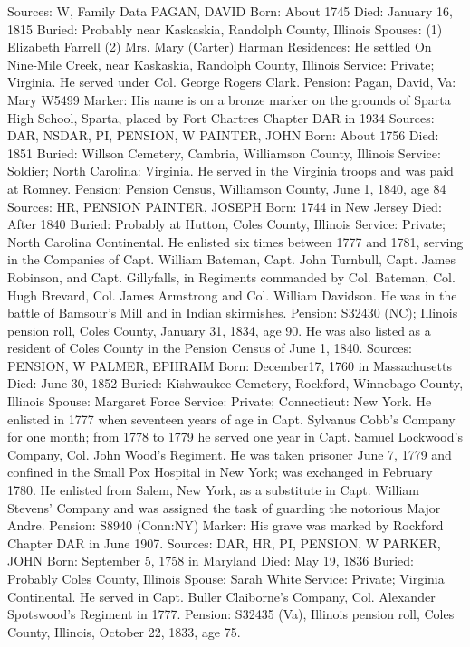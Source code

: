 Sources: W, Family Data 
PAGAN, DAVID 
Born: About 1745 
Died: January 16, 1815
Buried: Probably near Kaskaskia, Randolph County, Illinois 
Spouses: (1) Elizabeth Farrell
	 (2) Mrs. Mary (Carter) Harman
Residences: He settled On Nine-Mile Creek, near Kaskaskia, Randolph County, Illinois
Service: Private; Virginia. He served under Col. George Rogers Clark. Pension: Pagan, David, Va: Mary W5499
Marker: His name is on a bronze marker on the grounds of Sparta High School, Sparta, placed by Fort Chartres Chapter DAR in 1934
Sources: DAR, NSDAR, PI, PENSION, W 
PAINTER, JOHN 
Born: About 1756
Died: 1851
Buried: Willson Cemetery, Cambria, Williamson County, Illinois
Service: Soldier; North Carolina: Virginia. He served in the Virginia troops and was paid at Romney. 
Pension: Pension Census, Williamson County, June 1, 1840, age 84
Sources: HR, PENSION 
PAINTER, JOSEPH 
Born: 1744 in New Jersey
Died: After 1840
Buried: Probably at Hutton, Coles County, Illinois
Service: Private; North Carolina Continental. He enlisted six times between 1777 and 1781, serving in the Companies of Capt. William Bateman, Capt. John Turnbull, Capt. James Robinson, and Capt. Gillyfalls, in Regiments com­manded by Col. Bateman, Col. Hugh Brevard, Col. James Armstrong and Col. William Davidson. He was in the battle of Bamsour's Mill and in Indian skirmishes. 
Pension: S32430 (NC); Illinois pension roll, Coles County, January 31, 1834, age 90. He was also listed as a resident of Coles County in the Pension Census of June 1, 1840. 
Sources: PENSION, W 
PALMER, EPHRAIM 
Born: December17, 1760 in Massachusetts
Died: June 30, 1852
Buried: Kishwaukee Cemetery, Rockford, Winnebago County, Illinois 
Spouse: Margaret Force
Service: Private; Connecticut: New York. He enlisted in 1777 when seventeen years of age in Capt. Sylvanus Cobb's Company for one month; from 1778 to 1779 he served one year in Capt. Samuel Lockwood's Company, Col. John Wood's Regiment. He was taken prisoner June 7, 1779 and confined in the Small Pox Hospital in New York; was exchanged in February 1780. He enlisted from Salem, New York, as a substitute in Capt. William Stevens' Company and was assigned the task of guarding the notorious Major Andre. 
Pension: S8940 (Conn:NY) 
Marker: His grave was marked by Rockford Chapter DAR in June 1907. 
Sources: DAR, HR, PI, PENSION, W 
PARKER, JOHN 
Born: September 5, 1758 in Maryland 
Died: May 19, 1836 
Buried: Probably Coles County, Illinois 
Spouse: Sarah White
Service: Private; Virginia Continental. He served in Capt. Buller Claiborne's Company, Col. Alexander Spotswood's Regiment in 1777. Pension: S32435 (Va), Illinois pension roll, Coles County, Illinois, October 22, 1833, age 75. 
